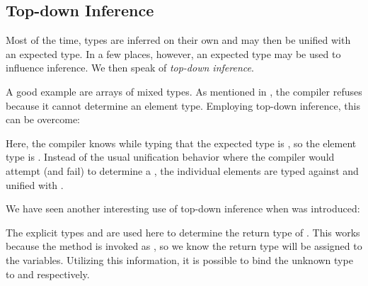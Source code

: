 \documentclass{haxe}
\begin{document}
\subsection{Top-down Inference}
\label{type-system-top-down-inference}

Most of the time, types are inferred on their own and may then be unified with an expected type. In a few places, however, an expected type may be used to influence inference. We then speak of \emph{top-down inference}.


A good example are arrays of mixed types. As mentioned in , the compiler refuses \expr{[1, "foo"]} because it cannot determine an element type. Employing top-down inference, this can be overcome:


Here, the compiler knows while typing \expr{[1, "foo"]} that the expected type is , so the element type is . Instead of the usual unification behavior where the compiler would attempt (and fail) to determine a , the individual elements are typed against and unified with .

We have seen another interesting use of top-down inference when  was introduced:


The explicit types  and  are used here to determine the return type of . This works because the method is invoked as , so we know the return type will be assigned to the variables. Utilizing this information, it is possible to bind the unknown type  to  and  respectively.


\end{document}
